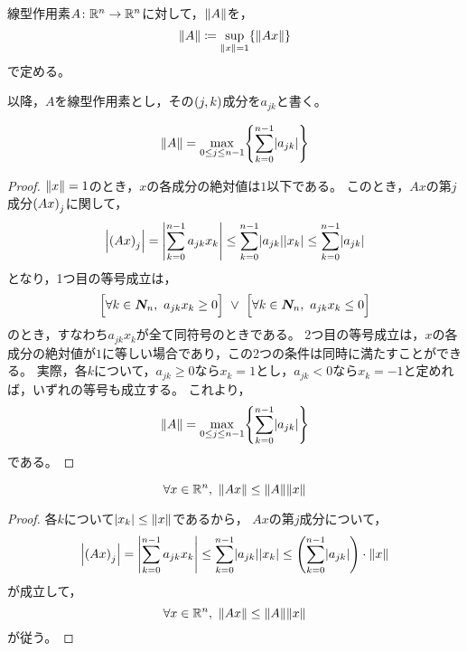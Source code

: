 \documentclass[b5paper,draft,oneside,openany]{ltjsbook} %
\begin{document}
\begin{defi}[作用素ノルム]
    線型作用素$A\colon \mathbb{R}^n\to\mathbb{R}^n$に対して，$\norm{A}$を，
    \begin{equation}
        \norm{A}\coloneqq \sup_{\norm{x}=1}\bra{\norm{Ax}}
    \end{equation}
    で定める。
\end{defi}

以降，$A$を線型作用素とし，その$\pare{j,k}$成分を$a_{jk}$と書く。

\begin{prop}
    \begin{equation}
        \norm{A} = \max_{0\leq j\leq n-1} \bra{\sum_{k=0}^{n-1} \abs{a_{jk}}}
    \end{equation}
    \begin{proof}
        $\norm{x}=1$のとき，$x$の各成分の絶対値は$1$以下である。
        このとき，$Ax$の第$j$成分$\pare{Ax}_j$に関して，
        \begin{equation}
            \abs{\pare{Ax}_j}=\abs{\sum_{k=0}^{n-1}a_{jk} x_k}
            \leq \sum_{k=0}^{n-1}\abs{a_{jk}}\abs{x_k}\leq \sum_{k=0}^{n-1}\abs{a_{jk}}
        \end{equation}
        となり，1つ目の等号成立は，
        \begin{equation}
            \bsqu{\forall k\in\setN,\ a_{jk}x_k\geq 0}
            \ \lor\ 
            \bsqu{\forall k\in\setN,\ a_{jk}x_k\leq 0}
        \end{equation}
        のとき，すなわち$a_{jk}x_k$が全て同符号のときである。
        2つ目の等号成立は，$x$の各成分の絶対値が$1$に等しい場合であり，この2つの条件は同時に満たすことができる。
        実際，各$k$について，$a_{jk}\geq 0$なら$x_k=1$とし，$a_{jk}<0$なら$x_k=-1$と定めれば，いずれの等号も成立する。
        これより，
        \begin{equation}
            \norm{A} = \max_{0\leq j\leq n-1} \bra{\sum_{k=0}^{n-1} \abs{a_{jk}}}
        \end{equation}
        である。
    \end{proof}
\end{prop}

\begin{prop}
    \begin{equation}
        \forall x\in \R^n,\ \norm{Ax}\leq \norm{A}\norm{x}
    \end{equation}
    \begin{proof}
        各$k$について$\abs{x_k}\leq \norm{x}$であるから，
        $Ax$の第$j$成分について，
        \begin{equation}
            \abs{\pare{Ax}_j}=\abs{\sum_{k=0}^{n-1}a_{jk}x_k}
            \leq \sum_{k=0}^{n-1} \abs{a_{jk}}\abs{x_k}
            \leq \pare{\sum_{k=0}^{n-1}\abs{a_{jk}}}\cdot \norm{x}
        \end{equation}
        が成立して，
        \begin{equation}
            \forall x\in \R^n,\ \norm{Ax}\leq \norm{A}\norm{x}
        \end{equation}
        が従う。
    \end{proof}
\end{prop}
\end{document}

